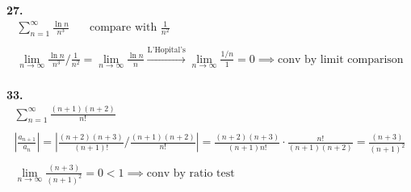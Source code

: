 \documentclass{article}
\begin{document}
\noindent
\textbf{27.}
\begin{gather*}
\sum_{n=1}^{\infty} \frac{\ln n}{n^3}
~~~~~~~~
\text{compare with } \frac{1}{n^2}
\\
\\
\lim_{n \to \infty} \frac{\ln n}{n^3} / \frac{1}{n^2}
=\lim_{n \to \infty} \frac{\ln n}{n}
\xrightarrow{\text{L'Hopital's}}\lim_{n \to \infty} \frac{1/n}{1}=0
\implies \text{conv by limit comparison}
\end{gather*}
\hfill
\\


\noindent
\textbf{33.}
\begin{gather*}
\sum_{n=1}^{\infty} \frac{(n+1)(n+2)}{n!}
\\
\\
\left| \frac{a_{n+1}}{a_n} \right|
=\left| \frac{(n+2)(n+3)}{(n+1)!} / \frac{(n+1)(n+2)}{n!} \right|
=\frac{(n+2)(n+3)}{(n+1)n!} \cdot \frac{n!}{(n+1)(n+2)}
=\frac{(n+3)}{(n+1)^2}
\\
\\
\lim_{n \to \infty} \frac{(n+3)}{(n+1)^2} = 0<1
\implies \text{conv by ratio test}
\end{gather*}
\end{document}
